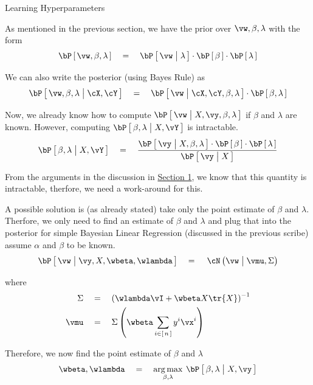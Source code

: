 \documentclass{article}
\begin{document}
\begin{ssection}[2]{Learning Hyperparameters}

	As mentioned in the previous section, we have the prior over $\vw, \beta, \lambda$ with the form
	\begin{equation}
		\prob{\vw, \beta, \lambda}	\eq	\prob{\vw \pipe \lambda} \cdot \prob{\beta} \cdot \prob{\lambda}
	\end{equation}

	We can also write the posterior (using Bayes Rule) as
	\begin{equation}
		\prob{\vw, \beta, \lambda \pipe \cX, \cY}	\eq	\prob{\vw \pipe \cX, \cY, \beta, \lambda} \cdot \prob{\beta, \lambda}
		\label{eq:pos-bayes}
	\end{equation}

	Now, we already know how to compute $\prob{\vw \pipe X, \vy, \beta, \lambda}$ if $\beta$ and $\lambda$ are known. However, computing $\prob{\beta, \lambda \pipe X, \vY}$ is intractable.
	\begin{align*}
		\prob{\beta, \lambda \pipe X, \vY}	\eq	\frac{\prob{\vy \pipe X, \beta, \lambda} \cdot \prob{\beta} \cdot \prob{\lambda}}{\prob{\vy \pipe X}}
	\end{align*}

	From the arguments in the discussion in \hyperlink{sec:1}{Section 1}, we know that this quantity is intractable, therfore, we need a work-around for this. \br

	A possible solution is (as already stated) take only the point estimate of $\beta$ and $\lambda$. Therfore, we only need to find an estimate of $\beta$ and $\lambda$ and plug that into the posterior for simple Bayesian Linear Regression (discussed in the previous scribe) \ie assume $\alpha$ and $\beta$ to be known. \br
	\begin{equation}
		\prob{\vw \pipe \vy, X, \wbeta, \wlambda}	\eq	\ND{\vw \pipe \vmu, \Sigma}
		\label{eq:pos-w}
	\end{equation}

	where
	\begin{align*}
		\Sigma	&\eq	\para{\wlambda \vI + \wbeta X \tr{X}}^{-1} \\
		\vmu	&\eq	\Sigma \para{\wbeta \sum_{i \in \brac{n}} y^i \vx^i}
	\end{align*}

	Therefore, we now find the point estimate of $\beta$ and $\lambda$
	\begin{align*}
		\wbeta, \wlambda	\eq	\argmax{\beta, \lambda} \prob{\beta, \lambda \pipe X, \vy}
	\end{align*}


\end{ssection}
\end{document}

